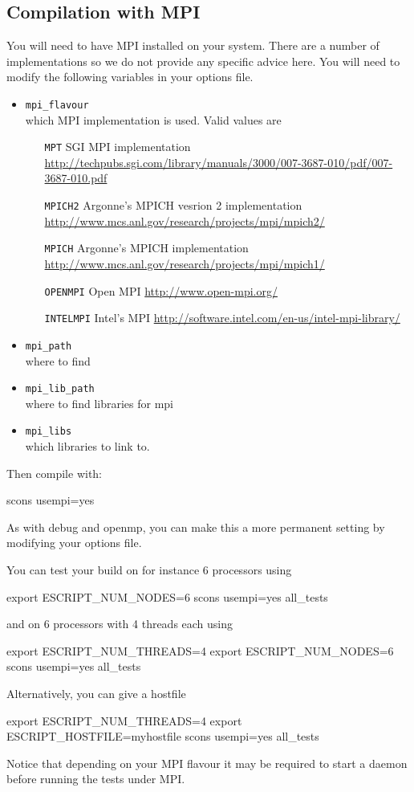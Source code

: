 \subsection{Compilation with MPI}
You will need to have MPI installed on your system.
There are a number of implementations so we do not provide any specific advice here.
You will need to modify the following variables in your options file.
\begin{itemize}
\item \texttt{mpi_flavour} \\
	which MPI implementation is used. Valid values are  \begin{itemize}
    \item[\texttt{MPT}] SGI MPI implementation    \\     \url{http://techpubs.sgi.com/library/manuals/3000/007-3687-010/pdf/007-3687-010.pdf}
     \item[\texttt{MPICH2}] Argonne's MPICH vesrion 2 implementation \\ \url{http://www.mcs.anl.gov/research/projects/mpi/mpich2/}
     \item[\texttt{MPICH}] Argonne's MPICH implementation \\ \url{http://www.mcs.anl.gov/research/projects/mpi/mpich1/}
      \item[\texttt{OPENMPI}] Open MPI \url{http://www.open-mpi.org/}
      \item[\texttt{INTELMPI}] Intel's MPI \url{http://software.intel.com/en-us/intel-mpi-library/}
   \end{itemize}
 \item \texttt{mpi_path} \\
	where to find 
\item \texttt{mpi_lib_path} \\
	where to find libraries for mpi
\item \texttt{mpi_libs} \\
	which libraries to link to.
\end{itemize}

Then compile with:
\begin{shellCode}
 scons usempi=yes
\end{shellCode}

As with debug and openmp, you can make this a more permanent setting by modifying your options file.

You can test your build on for instance 6 processors using 
\begin{shellCode}
export ESCRIPT_NUM_NODES=6
scons usempi=yes all_tests
\end{shellCode}
and on  6 processors with 4 threads each using 
\begin{shellCode}
export ESCRIPT_NUM_THREADS=4
export ESCRIPT_NUM_NODES=6
scons usempi=yes all_tests
\end{shellCode}
Alternatively, you can give a hostfile
\begin{shellCode}
export ESCRIPT_NUM_THREADS=4
export ESCRIPT_HOSTFILE=myhostfile
scons usempi=yes all_tests
\end{shellCode}
Notice that depending on your MPI flavour it may be required to start a daemon before running the tests under MPI.


